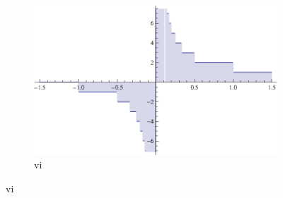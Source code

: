 \documentclass[12pt]{article}
\begin{document}
\begin{figure}[!hblp]
\begin{subfigure}[b]{0.5\textwidth}
        \end{subfigure}%
        \begin{subfigure}[b]{0.5\textwidth}
                \includegraphics[width=\textwidth]{6.eps}
                \caption{vi}

               \end{subfigure}
\end{figure}
\end{document}
